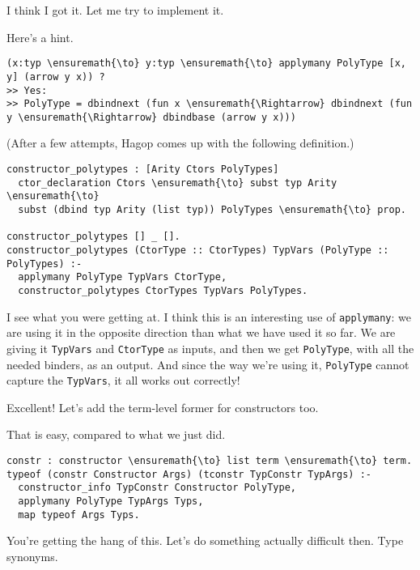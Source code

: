 \heroSTUDENT{} I think I got it. Let me try to implement it.

\heroADVISOR{} Here's a hint.

\begin{verbatim}
(x:typ \ensuremath{\to} y:typ \ensuremath{\to} applymany PolyType [x, y] (arrow y x)) ?
>> Yes:
>> PolyType = dbindnext (fun x \ensuremath{\Rightarrow} dbindnext (fun y \ensuremath{\Rightarrow} dbindbase (arrow y x)))
\end{verbatim}

\begin{scenecomment}
(After a few attempts, Hagop comes up with the following definition.)
\end{scenecomment}

\begin{verbatim}
constructor_polytypes : [Arity Ctors PolyTypes]
  ctor_declaration Ctors \ensuremath{\to} subst typ Arity \ensuremath{\to}
  subst (dbind typ Arity (list typ)) PolyTypes \ensuremath{\to} prop.

constructor_polytypes [] _ [].
constructor_polytypes (CtorType :: CtorTypes) TypVars (PolyType :: PolyTypes) :-
  applymany PolyType TypVars CtorType,
  constructor_polytypes CtorTypes TypVars PolyTypes.
\end{verbatim}

\heroSTUDENT{} I see what you were getting at. I think this is an interesting
use of \texttt{applymany}: we are using it in the opposite direction
than what we have used it so far. We are giving it \texttt{TypVars} and
\texttt{CtorType} as inputs, and then we get \texttt{PolyType}, with all
the needed binders, as an output. And since the way we're using it,
\texttt{PolyType} cannot capture the \texttt{TypVars}, it all works out
correctly!

\heroADVISOR{} Excellent! Let's add the term-level former for constructors
too.

\heroSTUDENT{} That is easy, compared to what we just did.

\begin{verbatim}
constr : constructor \ensuremath{\to} list term \ensuremath{\to} term.
typeof (constr Constructor Args) (tconstr TypConstr TypArgs) :-
  constructor_info TypConstr Constructor PolyType,
  applymany PolyType TypArgs Typs,
  map typeof Args Typs.
\end{verbatim}

\heroADVISOR{} You're getting the hang of this. Let's do something actually
difficult then. Type synonyms.
